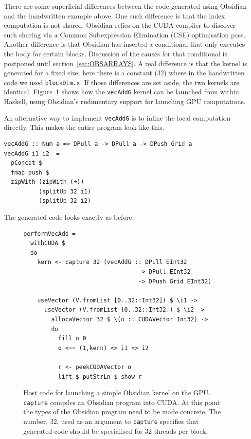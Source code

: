 \documentclass[a4paper]{book}
\begin{document}
There are some superficial differences between the code generated using Obsidian and the 
handwritten example above. One such difference is that the index computation is not shared. 
Obsidian relies on the CUDA compiler to discover such sharing via a Common Subexpression 
Elimination (CSE) optimisation pass. Another difference is that Obsidian has inserted a 
conditional that only executes the body for certain blocks. Discussion of the causes for 
that conditional is postponed until section~\ref{sec:OBSARRAYS}. A real 
difference is that the kernel is generated for a fixed size; here there is a constant (32) 
where in the handwritten code we used {\tt blockDim.x}. If those differences are set 
aside, the two kernels are identical. Figure~\ref{fig:OBSIDIANHOST1} shows how the 
{\tt vecAddG} kernel can be launched from within Haskell, using Obsidian's rudimentary 
support for launching GPU computations. 

An alternative way to implement {\tt vecAddG} is to inline the local computation 
directly. This makes the entire program look like this. 

\begin{small}
\begin{Verbatim}[samepage=true]
vecAddG :: Num a => DPull a -> DPull a -> DPush Grid a
vecAddG i1 i2  =
  pConcat $
  fmap push $
  zipWith (zipWith (+)) 
          (splitUp 32 i1)
          (splitUp 32 i2)
\end{Verbatim} 
\end{small} 

\noindent The generated code looks exactly as before. 


\begin{figure} 
\begin{small}
\begin{Verbatim}[samepage=true]
performVecAdd =
  withCUDA $
  do
    kern <- capture 32 (vecAddG :: DPull EInt32
                                 -> DPull EInt32
                                 -> DPush Grid EInt32)

    useVector (V.fromList [0..32::Int32]) $ \i1 ->
      useVector (V.fromList [0..32::Int32]) $ \i2 -> 
        allocaVector 32 $ \(o :: CUDAVector Int32) ->
        do
          fill o 0
          o <== (1,kern) <> i1 <> i2 

          r <- peekCUDAVector o
          lift $ putStrLn $ show r
\end{Verbatim} 
\end{small}

\caption{Host code for launching a simple Obsidian kernel on the GPU. \\ 
 {\tt capture} compiles an Obsidian program into CUDA. At this point the 
  types of the Obsidian program need to be made concrete. The number, 32, used as 
 an argument to {\tt capture} specifies that generated code should be specialised 
 for 32 threads per block. }
\label{fig:OBSIDIANHOST1}
\end{figure} 
\end{document}

